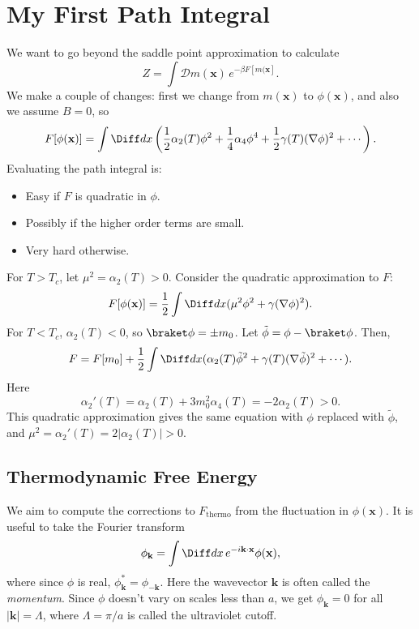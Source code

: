 \documentclass[12pt]{article}
\begin{document}

\newpage

\section{My First Path Integral}%
\label{sec:mlp}

We want to go beyond the saddle point approximation to calculate
\[
	Z = \int \mathcal{D} m(\mathbf{x}) \, e^{-\beta F[m(\mathbf{x}]}.
\]
We make a couple of changes: first we change from $m(\mathbf{x})$ to $\phi(\mathbf{x})$, and also we assume $B = 0$, so
\[
	F[\phi(\mathbf{x})] = \int \Diff dx \left( \frac{1}{2} \alpha_2(T) \phi^2 + \frac{1}{4} \alpha_4 \phi^4 + \frac{1}{2}\gamma(T) (\nabla \phi)^2 + \cdots \right).
\]
Evaluating the path integral is:
\begin{itemize}
	\item Easy if $F$ is quadratic in $\phi$.
	\item Possibly if the higher order terms are small.
	\item Very hard otherwise.
\end{itemize}

For $T > T_c$, let $\mu^2 = \alpha_2(T) > 0$. Consider the quadratic approximation to $F$:
\[
	F[\phi(\mathbf{x})] = \frac{1}{2} \int \Diff dx (\mu^2 \phi^2 + \gamma (\nabla \phi)^2).
\]
For $T < T_c$, $\alpha_2(T) < 0$, so $\braket \phi = \pm m_0$. Let $\tilde \phi = \phi - \braket \phi$. Then,
\[
	F = F[m_0] + \frac{1}{2} \int \Diff dx (\alpha_2(T) \tilde \phi^2 + \gamma(T) (\nabla \tilde \phi)^2 + \cdots).
\]
Here
\[
\alpha_2'(T) = \alpha_2(T) + 3 m_0^2 \alpha_4(T) = -2 \alpha_2(T) > 0.
\]
This quadratic approximation gives the same equation with $\phi$ replaced with $\tilde \phi$, and $\mu^2 = \alpha_2'(T) = 2|\alpha_2(T)| > 0$.

\subsection{Thermodynamic Free Energy}%
\label{sub:tfe}

We aim to compute the corrections to $F_{\mathrm{thermo}}$ from the fluctuation in $\phi(\mathbf{x})$. It is useful to take the Fourier transform
\[
\phi_{\mathbf{k}} = \int \Diff d x \, e^{-i \mathbf{k} \cdot \mathbf{x}} \phi(\mathbf{x}),
\]
where since $\phi$ is real, $\phi^\ast_{\mathbf{k}} = \phi_{-{\mathbf{k}}}$. Here the wavevector $\mathbf{k}$ is often called the \emph{momentum}. Since $\phi$ doesn't vary on scales less than $a$, we get $\phi_{\mathbf{k}} = 0$ for all $|\mathbf{k}| = \Lambda$, where $\Lambda = \pi/a$ is called the ultraviolet cutoff.
\end{document}
